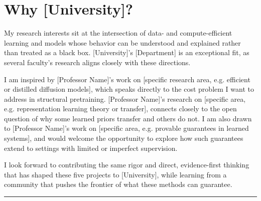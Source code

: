 \documentclass[11pt]{article}
\begin{document}
\section*{Why [University]?}

My research interests sit at the intersection of data- and compute-efficient learning and models whose behavior can be understood and explained rather than treated as a black box. [University]'s [Department] is an exceptional fit, as several faculty's research aligns closely with these directions.

I am inspired by [Professor Name]'s work on [specific research area, e.g. efficient or distilled diffusion models], which speaks directly to the cost problem I want to address in structural pretraining. [Professor Name]'s research on [specific area, e.g. representation learning theory or transfer], connects closely to the open question of why some learned priors transfer and others do not. I am also drawn to [Professor Name]'s work on [specific area, e.g. provable guarantees in learned systems], and would welcome the opportunity to explore how such guarantees extend to settings with limited or imperfect supervision.

I look forward to contributing the same rigor and direct, evidence-first thinking that has shaped these five projects to [University], while learning from a community that pushes the frontier of what these methods can guarantee.

\vspace{4pt}
\hrule
\vspace{4pt}
\end{document}
